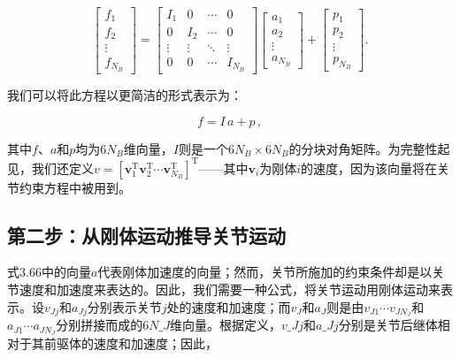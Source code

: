 \documentclass[10pt,a4paper]{book}
\theoremstyle{thmstyle} %
\theoremstyle{defstyle} %
\theoremstyle{prostyle} %
\begin{document}
$$
\left[ \begin{array}{l} { f _ { 1 } } \\{ f _ { 2 } } \\{ \vdots } \\{ f _ { N _ { B } } } \end{array} \right] = \left[ \begin{array}{llll} { I _ { 1 } } & { 0 } & { \cdots } & { 0 } \\{ 0 } & { I _ { 2 } } & { \cdots } & { 0 } \\{ \vdots } & { \vdots } & { \ddots } & { \vdots } \\{ 0 } & { 0 } & { \cdots } & { I _ { N _ { B } } } \end{array} \right] \left[ \begin{array}{l} { a _ { 1 } } \\{ a _ { 2 } } \\{ \vdots } \\{ a _ { N _ { B } } } \end{array} \right] + \left[ \begin{array}{l} { p _ { 1 } } \\{ p _ { 2 } } \\{ \vdots } \\{ p _ { N _ { B } } } \end{array} \right] .
$$



我们可以将此方程以更简洁的形式表示为：



$$
f = I \, a + p \, ,
$$



其中$f$、$a$和$p$均为$6N_{B}$维向量，$I$则是一个$6N_{B} \times 6N_{B}$的分块对角矩阵。为完整性起见，我们还定义$v = [\boldsymbol{v}_{1}^{\mathrm{T}} \boldsymbol{v}_{2}^{\mathrm{T}} \cdots \boldsymbol{v}_{N_{B}}^{\mathrm{T}}]^{\mathrm{T}}$——其中$\boldsymbol{v}_{i}$为刚体$i$的速度，因为该向量将在关节约束方程中被用到。



\subsection{第二步：从刚体运动推导关节运动}





式3.66中的向量$a$代表刚体加速度的向量；然而，关节所施加的约束条件却是以关节速度和加速度来表达的。因此，我们需要一种公式，将关节运动用刚体运动来表示。设$v_{Jj}$和$a_{Jj}$分别表示关节$j$处的速度和加速度；而$v_{J}$和$a_{J}$则是由$v_{J1} \cdots v_{JN_{J}}$和$a_{J1} \cdots a_{JN_{J}}$分别拼接而成的$6N\_{J}$维向量。根据定义，$v\_{Jj}$和$a\_{Jj}$分别是关节后继体相对于其前驱体的速度和加速度；因此，
\end{document}

